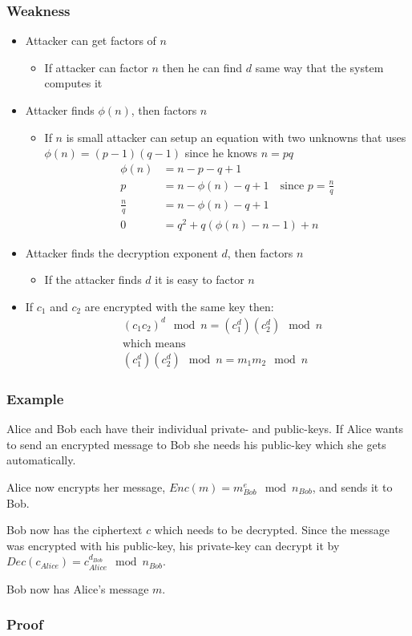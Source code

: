 \subsubsection*{Weakness}
\begin{itemize}
\item Attacker can get factors of $n$
  \begin{itemize}
  \item If attacker can factor $n$ then he can find $d$ same way that
    the system computes it
  \end{itemize}
\item Attacker finds $\phi (n)$, then factors $n$
  \begin{itemize}
  \item If $n$ is small attacker can setup an equation with two unknowns
    that uses $\phi (n)=(p-1)(q-1)$ since he knows $n=pq$
    \begin{align*}
      \phi(n) &= n - p - q + 1 \\
      p &= n - \phi(n) - q + 1 \quad \text{since } p = \frac{n}{q} \\
      \frac{n}{q} &= n - \phi(n) - q + 1 \\
      0 &= q^2 + q(\phi(n) - n - 1) + n
    \end{align*}
  \end{itemize}
\item Attacker finds the decryption exponent $d$, then factors $n$
  \begin{itemize}
  \item If the attacker finds $d$ it is easy to factor $n$
  \end{itemize}
\item If $c_1$ and $c_2$ are encrypted with the same key then:
  \begin{align*}
    &(c_1c_2)^d \mod n = (c_1^d) (c_2^d) \mod n \\
    &\text{which means} \\
    &(c_1^d) (c_2^d) \mod n = m_1m_2 \mod n
  \end{align*}
\end{itemize}

\subsubsection*{Example}
Alice and Bob each have their individual private- and public-keys. If
Alice wants to send an encrypted message to Bob she needs his
public-key which she gets automatically.

Alice now encrypts her message, $Enc(m)=m^e_{Bob} \mod n_{Bob}$, and
sends it to Bob.

Bob now has the ciphertext $c$ which needs to be decrypted. Since the
message was encrypted with his public-key, his private-key can decrypt
it by $Dec(c_{Alice}) = c^{d_{Bob}}_{Alice} \mod n_{Bob}$.

Bob now has Alice’s message $m$.

\subsubsection*{Proof}

